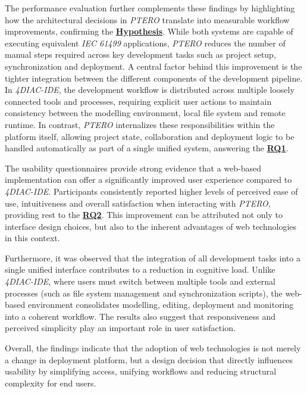The performance evaluation further complements these findings by highlighting how the architectural decisions in \textit{PTERO} translate into measurable workflow improvements, confirming the \hyperlink{hypothesis}{\textbf{Hypothesis}}. While both systems are capable of executing equivalent \textit{IEC 61499} applications, \textit{PTERO} reduces the number of manual steps required across key development tasks such as project setup, synchronization and deployment. A central factor behind this improvement is the tighter integration between the different components of the development pipeline. In \textit{4DIAC-IDE}, the development workflow is distributed across multiple loosely connected tools and processes, requiring explicit user actions to maintain consistency between the modelling environment, local file system and remote runtime. In contrast, \textit{PTERO} internalizes these responsibilities within the platform itself, allowing project state, collaboration and deployment logic to be handled automatically as part of a single unified system, answering the \hyperlink{rq1}{\textbf{RQ1}}.

The usability questionnaires provide strong evidence that a web-based implementation can offer a significantly improved user experience compared to \textit{4DIAC-IDE}. Participants consistently reported higher levels of perceived ease of use, intuitiveness and overall satisfaction when interacting with \textit{PTERO}, providing rest to the \hyperlink{rq2}{\textbf{RQ2}}. This improvement can be attributed not only to interface design choices, but also to the inherent advantages of web technologies in this context.

Furthermore, it was observed that the integration of all development tasks into a single unified interface contributes to a reduction in cognitive load. Unlike \textit{4DIAC-IDE}, where users must switch between multiple tools and external processes (such as file system management and synchronization scripts), the web-based environment consolidates modelling, editing, deployment and monitoring into a coherent workflow. The results also suggest that responsiveness and perceived simplicity play an important role in user satisfaction.

Overall, the findings indicate that the adoption of web technologies is not merely a change in deployment platform, but a design decision that directly influences usability by simplifying access, unifying workflows and reducing structural complexity for end users.
